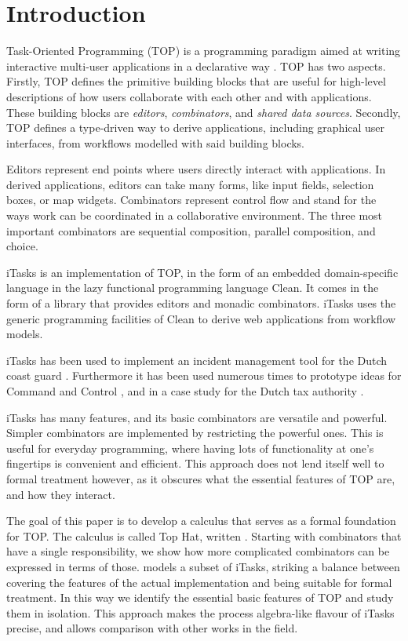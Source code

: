 
\section{Introduction}

Task-Oriented Programming (TOP) is a programming paradigm aimed at writing interactive multi-user applications in a declarative way \cite{conf/ppdp/PlasmeijerLMAK12}.
TOP has two aspects.
Firstly, TOP defines the primitive building blocks that are useful for high-level descriptions of how users collaborate with each other and with applications.
These building blocks are \emph{editors}, \emph{combinators}, and \emph{shared data sources}.
Secondly, TOP defines a type-driven way to derive applications, including graphical user interfaces, from workflows modelled with said building blocks.

Editors represent end points where users directly interact with applications.
In derived applications, editors can take many forms, like input fields, selection boxes, or map widgets.
Combinators represent control flow and stand for the ways work can be coordinated in a collaborative environment.
The three most important combinators are sequential composition, parallel composition, and choice.

iTasks is an implementation of TOP, in the form of an embedded domain-specific language in the lazy functional programming language Clean.
It comes in the form of a library that provides editors and monadic combinators.
iTasks uses the generic programming facilities of Clean to derive web applications from workflow models.

iTasks has been used to implement an incident management tool for the Dutch coast guard \cite{conf/iscram/LijnseJP12}.
Furthermore it has been used numerous times to prototype ideas for Command and Control \cite{theses/nlda/Kool17, theses/radboud/Stutterheim17}, and in a case study for the Dutch tax authority \cite{conf/sfp/StutterheimAP17}.

iTasks has many features, and its basic combinators are versatile and powerful.
Simpler combinators are implemented by restricting the powerful ones.
This is useful for everyday programming, where having lots of functionality at one's fingertips is convenient and efficient.
This approach does not lend itself well to formal treatment however, as it obscures what the essential features of TOP are, and how they interact.

The goal of this paper is to develop a calculus that serves as a formal foundation for TOP.
The calculus is called Top Hat, written \tophat.
Starting with combinators that have a single responsibility, we show how more complicated combinators can be expressed in terms of those.
\tophat models a subset of iTasks, striking a balance between covering the features of the actual implementation and being suitable for formal treatment.
In this way we identify the essential basic features of TOP and study them in isolation.
This approach makes the process algebra-like flavour of iTasks precise, and allows comparison with other works in the field.
